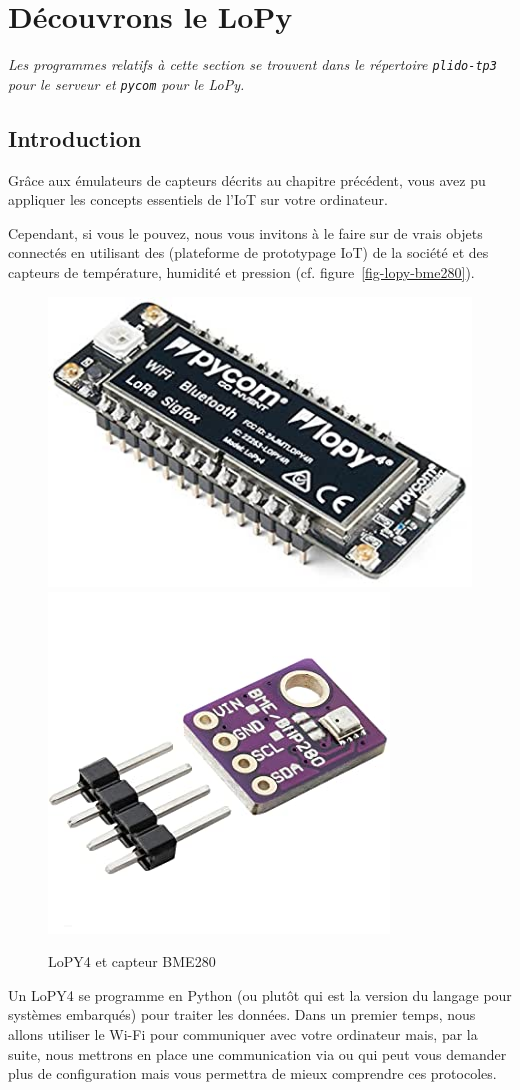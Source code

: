 \cleardoublepage
\chapter{Découvrons le LoPy}

\textit{Les programmes relatifs à cette section se trouvent dans le répertoire \texttt{plido-tp3} pour le serveur et \texttt{pycom} pour le LoPy.}

\section{Introduction}

Grâce aux émulateurs de capteurs décrits au chapitre précédent, vous avez pu appliquer les concepts essentiels de l'IoT sur votre ordinateur.

Cependant, si vous le pouvez, nous vous invitons à le faire sur de vrais objets connectés en utilisant des  (plateforme de prototypage IoT) de la société  et des capteurs de température, humidité et pression  (cf. figure~\vref{fig-lopy-bme280}). 

\begin{figure}[tbp]
\centerline{\includegraphics[width=.5\columnwidth]{Pictures/LoPy.jpg}  \includegraphics[width=.3\columnwidth]{Pictures/BME280.jpeg}}
\caption{LoPY4 et capteur BME280}
\label{fig-lopy-bme280}
\end{figure}

Un LoPY4 se programme en Python (ou plutôt  qui est la version du langage pour systèmes embarqués) pour traiter les données. Dans un premier temps, nous allons utiliser le Wi-Fi pour communiquer avec votre ordinateur mais, par la suite, nous mettrons en place une communication via  ou  qui peut vous demander plus de configuration mais vous permettra de mieux comprendre ces protocoles.

